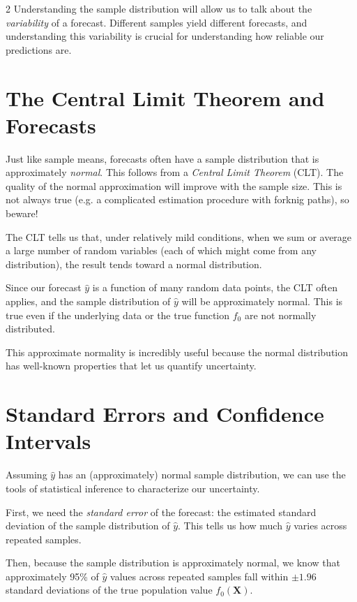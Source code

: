 \documentclass[12pt]{article}
\begin{document}
\begin{multicols}{2}
  Understanding the sample distribution will allow us to talk about the \emph{variability} of a forecast.
  Different samples yield different forecasts, and understanding this variability is crucial for understanding how reliable our predictions are.

  \section*{The Central Limit Theorem and Forecasts}

  Just like sample means, forecasts often have a sample distribution that is approximately \emph{normal}.
  This follows from a \emph{Central Limit Theorem} (CLT).
  The quality of the normal approximation will improve with the sample size.
  This is not always true (e.g. a complicated estimation procedure with forknig paths), so beware!

  The CLT tells us that, under relatively mild conditions, when we sum or average a large number of random variables (each of which might come from any distribution), the result tends toward a normal distribution.

  Since our forecast $\hat{y}$ is a function of many random data points, the CLT often applies, and the sample distribution of $\hat{y}$ will be approximately normal. This is true even if the underlying data or the true function $f_0$ are not normally distributed.

  This approximate normality is incredibly useful because the normal distribution has well-known properties that let us quantify uncertainty.

  \section*{Standard Errors and Confidence Intervals}

  Assuming $\hat{y}$ has an (approximately) normal sample distribution, we can use the tools of statistical inference to characterize our uncertainty.

  First, we need the \emph{standard error} of the forecast: the estimated standard deviation of the sample distribution of $\hat{y}$. This tells us how much $\hat{y}$ varies across repeated samples.

  Then, because the sample distribution is approximately normal, we know that approximately 95\% of $\hat{y}$ values across repeated samples fall within $\pm 1.96$ standard deviations of the true population value $f_0(\bm{X})$.


\end{multicols}
\end{document}
